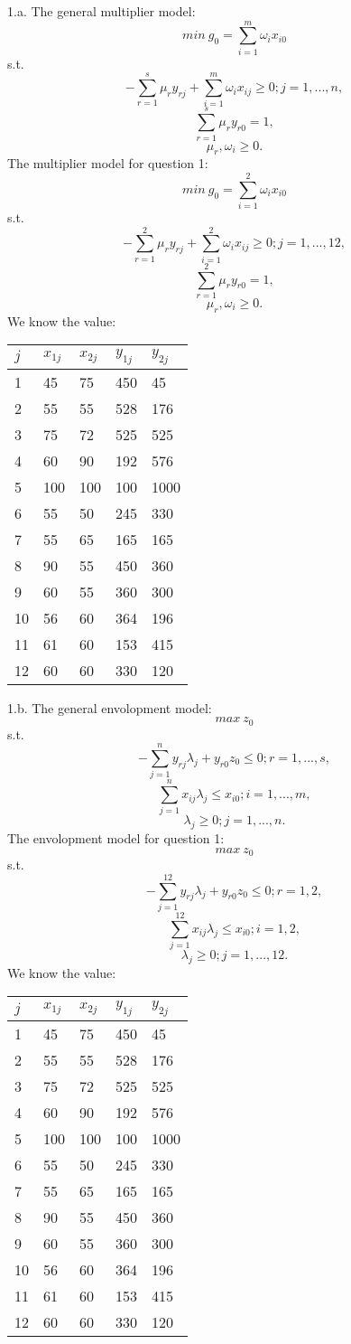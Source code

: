 \documentclass{article}
\begin{document}
1.a.
The general multiplier model:
$$ min\ g_0 = \sum_{i=1}^m \omega_i x_{i0} $$
s.t.
$$ - \sum_{r=1}^s \mu_r y_{rj} + \sum_{i=1}^m \omega_i x_{ij} \geq 0; j = 1, ..., n, $$
$$ \sum_{r=1}^s \mu_r y_{r0} = 1, $$
$$ \mu_r, \omega_i \geq 0. $$
The multiplier model for question 1:
$$ min\ g_0 = \sum_{i=1}^2 \omega_i x_{i0} $$
s.t.
$$ - \sum_{r=1}^2 \mu_r y_{rj} + \sum_{i=1}^2 \omega_i x_{ij} \geq 0; j = 1, ..., 12, $$
$$ \sum_{r=1}^2 \mu_r y_{r0} = 1, $$
$$ \mu_r, \omega_i \geq 0. $$
We know the value:
\begin{center}
  \begin{tabular}{l|l l l l}
  \hline
  $j$ & $x_{1j}$ & $x_{2j}$ & $y_{1j}$ & $y_{2j}$ \\
  \hline
  1 & 45 & 75 & 450 & 45 \\
  2 & 55 & 55 & 528 & 176 \\
  3 & 75 & 72& 525 & 525 \\
  4 & 60 & 90 & 192 & 576 \\
  5 & 100 & 100 & 100 & 1000 \\
  6 & 55 & 50 & 245 & 330 \\
  7 & 55 & 65 & 165 & 165 \\
  8 & 90 & 55 & 450 & 360 \\
  9 & 60 & 55 & 360 & 300 \\
  10 & 56 & 60 & 364 & 196 \\
  11 & 61 & 60 & 153 & 415 \\
  12 & 60 & 60 & 330 & 120 \\
  \hline
  \end{tabular}
\end{center}
1.b.
The general envolopment model:
$$ max\ z_0 $$
s.t.
$$ - \sum_{j = 1}^n y_{rj} \lambda_j + y_{r0} z_0 \leq 0; r = 1, ..., s, $$
$$ \sum_{j=1}^n x_{ij} \lambda_j \leq x_{i0}; i = 1, ..., m, $$
$$ \lambda_j \geq 0; j = 1, ..., n. $$
The envolopment model for question 1:
$$ max\ z_0 $$
s.t.
$$ - \sum_{j = 1}^{12} y_{rj} \lambda_j + y_{r0} z_0 \leq 0; r = 1, 2, $$
$$ \sum_{j=1}^{12} x_{ij} \lambda_j \leq x_{i0}; i = 1, 2, $$
$$ \lambda_j \geq 0; j = 1, ..., 12. $$
We know the value:
\begin{center}
  \begin{tabular}{l|l l l l}
  \hline
  $j$ & $x_{1j}$ & $x_{2j}$ & $y_{1j}$ & $y_{2j}$ \\
  \hline
  1 & 45 & 75 & 450 & 45 \\
  2 & 55 & 55 & 528 & 176 \\
  3 & 75 & 72& 525 & 525 \\
  4 & 60 & 90 & 192 & 576 \\
  5 & 100 & 100 & 100 & 1000 \\
  6 & 55 & 50 & 245 & 330 \\
  7 & 55 & 65 & 165 & 165 \\
  8 & 90 & 55 & 450 & 360 \\
  9 & 60 & 55 & 360 & 300 \\
  10 & 56 & 60 & 364 & 196 \\
  11 & 61 & 60 & 153 & 415 \\
  12 & 60 & 60 & 330 & 120 \\
  \hline
  \end{tabular}
\end{center}
\end{document}
